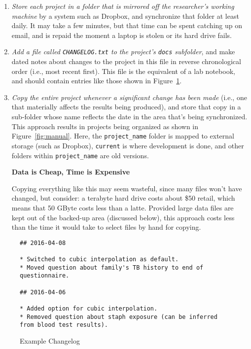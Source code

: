 \documentclass[10pt]{article}
\newcommand{\recommend}[1]{\textit{#1}}
\begin{document}
\begin{enumerate}

\item
  \recommend{Store each project in a folder that is mirrored off the
    researcher's working machine} by a system such as Dropbox, and
  synchronize that folder at least daily. It may take a few minutes,
  but that time can be spent catching up on email, and is repaid the
  moment a laptop is stolen or its hard drive fails.

\item
  \recommend{Add a file called \texttt{CHANGELOG.txt} to the project's
    \texttt{docs} subfolder}, and make dated notes about changes to
  the project in this file in reverse chronological order (i.e., most
  recent first). This file is the equivalent of a lab notebook, and
  should contain entries like those shown in Figure~\ref{fig:changelog}.

\item
  \recommend{Copy the entire project whenever a significant change has
    been made} (i.e., one that materially affects the results being
  produced), and store that copy in a sub-folder whose name reflects
  the date in the area that's being synchronized. This approach
  results in projects being organized as shown in Figure~\ref{fig:manual}.
  Here, the \texttt{project\_name} folder is mapped to external storage
  (such as Dropbox), \texttt{current} is where development is done, and
  other folders within \texttt{project\_name} are old versions.

  \begin{framed}
    \noindent \textbf{Data is Cheap, Time is Expensive}

    Copying everything like this may seem wasteful, since many files won't
    have changed, but consider: a terabyte hard drive costs about \$50
    retail, which means that 50 GByte costs less than a latte. Provided
    large data files are kept out of the backed-up area (discussed below),
    this approach costs less than the time it would take to select files by
    hand for copying.
  \end{framed}

\end{enumerate}

\begin{figure}
\begin{verbatim}
## 2016-04-08

* Switched to cubic interpolation as default.
* Moved question about family's TB history to end of questionnaire.

## 2016-04-06

* Added option for cubic interpolation.
* Removed question about staph exposure (can be inferred from blood test results).
\end{verbatim}
\caption{Example Changelog}
\label{fig:changelog}
\end{figure}
\end{document}
